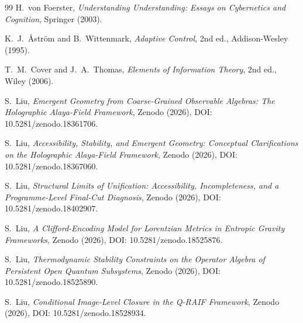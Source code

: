 \documentclass[12pt]{article}
\begin{document}
\begin{thebibliography}{99}
H.~von Foerster,
\emph{Understanding Understanding: Essays on Cybernetics
and Cognition},
Springer (2003).

K.~J.~\AA{}str\"{o}m and B.~Wittenmark,
\emph{Adaptive Control},
2nd ed., Addison-Wesley (1995).

T.~M.~Cover and J.~A.~Thomas,
\emph{Elements of Information Theory},
2nd ed., Wiley (2006).

S.~Liu, \emph{Emergent Geometry from Coarse-Grained Observable Algebras: The Holographic Alaya-Field Framework}, Zenodo (2026), DOI: 10.5281/zenodo.18361706.

S.~Liu, \emph{Accessibility, Stability, and Emergent Geometry: Conceptual Clarifications on the Holographic Alaya-Field Framework}, Zenodo (2026), DOI: 10.5281/zenodo.18367060.

S.~Liu, \emph{Structural Limits of Unification: Accessibility, Incompleteness, and a Programme-Level Final-Cut Diagnosis}, Zenodo (2026), DOI: 10.5281/zenodo.18402907.

S.~Liu, \emph{A Clifford-Encoding Model for Lorentzian Metrics in Entropic Gravity Frameworks}, Zenodo (2026), DOI: 10.5281/zenodo.18525876.

S.~Liu, \emph{Thermodynamic Stability Constraints on the Operator Algebra of Persistent Open Quantum Subsystems}, Zenodo (2026), DOI: 10.5281/zenodo.18525890.

S.~Liu, \emph{Conditional Image-Level Closure in the Q-RAIF Framework}, Zenodo (2026), DOI: 10.5281/zenodo.18528934.

\end{thebibliography}
\end{document}

